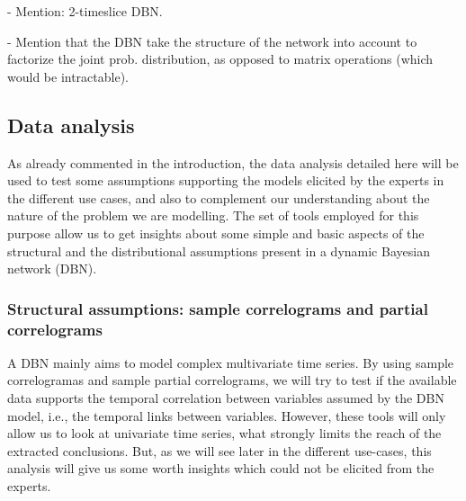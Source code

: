 - Mention: 2-timeslice DBN.

- Mention that the DBN take the structure of the network into account to factorize the joint prob. distribution, as opposed to matrix operations (which would be intractable).

\subsection{Data analysis}

As already commented in the introduction, the data analysis detailed here will be used to test some assumptions supporting the models elicited by the experts in the different use cases, and also to complement our understanding about the nature of the problem we are modelling. The set of tools employed for this purpose allow us to get insights about some simple and basic aspects of the structural and the distributional assumptions present in a dynamic Bayesian network (DBN).

\subsubsection*{Structural assumptions: sample correlograms and partial correlograms}

A DBN mainly aims to model complex multivariate time series. By using sample correlogramas and sample partial correlograms, we will try to test if the available data supports the temporal correlation between variables assumed by the DBN model, i.e., the temporal links between variables. However, these tools will only allow us to look at univariate time series, what strongly limits the reach of the  extracted conclusions. But, as we will see later in the different use-cases, this analysis will give us some worth insights which could not be elicited from the experts.  

